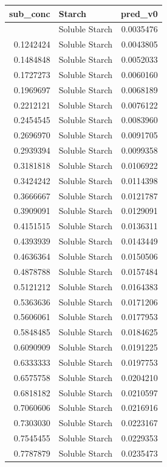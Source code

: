 \documentclass[
  12pt,
]{article}
\newcounter{none} %
\begin{document}
{\def\LTcaptype{none} %
\begin{longtable}[]{@{}rlr@{}}
\toprule\noalign{}
sub\_conc & Starch & pred\_v0 \\
\midrule\noalign{}
\endhead
\bottomrule\noalign{}
\endlastfoot
0.1000000 & Soluble Starch & 0.0035476 \\
0.1242424 & Soluble Starch & 0.0043805 \\
0.1484848 & Soluble Starch & 0.0052033 \\
0.1727273 & Soluble Starch & 0.0060160 \\
0.1969697 & Soluble Starch & 0.0068189 \\
0.2212121 & Soluble Starch & 0.0076122 \\
0.2454545 & Soluble Starch & 0.0083960 \\
0.2696970 & Soluble Starch & 0.0091705 \\
0.2939394 & Soluble Starch & 0.0099358 \\
0.3181818 & Soluble Starch & 0.0106922 \\
0.3424242 & Soluble Starch & 0.0114398 \\
0.3666667 & Soluble Starch & 0.0121787 \\
0.3909091 & Soluble Starch & 0.0129091 \\
0.4151515 & Soluble Starch & 0.0136311 \\
0.4393939 & Soluble Starch & 0.0143449 \\
0.4636364 & Soluble Starch & 0.0150506 \\
0.4878788 & Soluble Starch & 0.0157484 \\
0.5121212 & Soluble Starch & 0.0164383 \\
0.5363636 & Soluble Starch & 0.0171206 \\
0.5606061 & Soluble Starch & 0.0177953 \\
0.5848485 & Soluble Starch & 0.0184625 \\
0.6090909 & Soluble Starch & 0.0191225 \\
0.6333333 & Soluble Starch & 0.0197753 \\
0.6575758 & Soluble Starch & 0.0204210 \\
0.6818182 & Soluble Starch & 0.0210597 \\
0.7060606 & Soluble Starch & 0.0216916 \\
0.7303030 & Soluble Starch & 0.0223167 \\
0.7545455 & Soluble Starch & 0.0229353 \\
0.7787879 & Soluble Starch & 0.0235473 \\

\end{longtable}}
\end{document}
